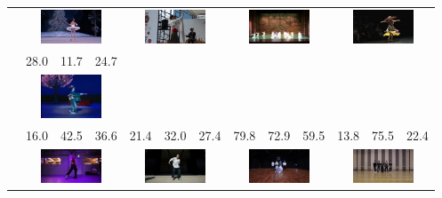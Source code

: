 \begin{table}[t]
\begin{center}
\begin{tabular}{|c|p{5mm}p{5mm}p{5mm}|p{5mm}p{5mm}p{5mm}|p{5mm}p{5mm}p{5mm}|p{5mm}p{5mm}p{5mm}|}
        & \multicolumn{3}{|c|}{\includegraphics[width=18mm]{images/snaps/ballet_elegant.png}}
        & \multicolumn{3}{|c|}{\includegraphics[width=18mm]{images/snaps/thai_elegant.png}}
        & \multicolumn{3}{|c|}{\includegraphics[width=18mm]{images/snaps/chinese_group_elegant.png}}
        & \multicolumn{3}{|c|}{\includegraphics[width=18mm]{images/snaps/belly_elegant.png}}
      \\ \cline{2-13}
        &28.0 &11.7 &24.7 & & & & & & & & & \\
        & \multicolumn{3}{|c|}{\includegraphics[width=18mm]{images/snaps/japanese2_elegant.png}}
        & \multicolumn{3}{|c|}{}
        & \multicolumn{3}{|c|}{}
        & \multicolumn{3}{|c|}{}
      \\ \hline
        &16.0 &42.5 &36.6 &21.4 &32.0 &27.4 &79.8 &72.9 &59.5 &13.8 &75.5 &22.4 \\
        & \multicolumn{3}{|c|}{\includegraphics[width=18mm]{images/snaps/ariana_dance.png}}
        & \multicolumn{3}{|c|}{\includegraphics[width=18mm]{images/snaps/kadokawa_dream_dance.png}}
        & \multicolumn{3}{|c|}{\includegraphics[width=18mm]{images/snaps/bts_group_dance.png}}
        & \multicolumn{3}{|c|}{\includegraphics[width=18mm]{images/snaps/arashi_group_dance.png}}

\end{tabular}
\end{center}
\end{table}
